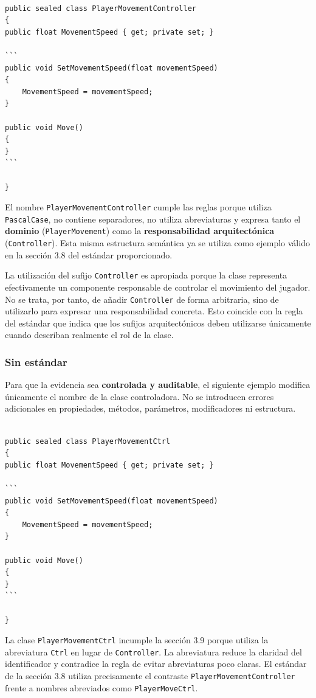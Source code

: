 \begin{lstlisting}[style=csharpstyle]

public sealed class PlayerMovementController
{
public float MovementSpeed { get; private set; }

```
public void SetMovementSpeed(float movementSpeed)
{
    MovementSpeed = movementSpeed;
}

public void Move()
{
}
```

}

\end{lstlisting}

El nombre \texttt{PlayerMovementController} cumple las reglas porque utiliza \texttt{PascalCase}, no contiene separadores, no utiliza abreviaturas y expresa tanto el \textbf{dominio} (\texttt{PlayerMovement}) como la \textbf{responsabilidad arquitectónica} (\texttt{Controller}). Esta misma estructura semántica ya se utiliza como ejemplo válido en la sección 3.8 del estándar proporcionado.

La utilización del sufijo \texttt{Controller} es apropiada porque la clase representa efectivamente un componente responsable de controlar el movimiento del jugador. No se trata, por tanto, de añadir \texttt{Controller} de forma arbitraria, sino de utilizarlo para expresar una responsabilidad concreta. Esto coincide con la regla del estándar que indica que los sufijos arquitectónicos deben utilizarse únicamente cuando describan realmente el rol de la clase.

\subsubsection{Sin estándar}

Para que la evidencia sea \textbf{controlada y auditable}, el siguiente ejemplo modifica únicamente el nombre de la clase controladora. No se introducen errores adicionales en propiedades, métodos, parámetros, modificadores ni estructura.

\begin{lstlisting}[style=csharpstyle]

public sealed class PlayerMovementCtrl
{
public float MovementSpeed { get; private set; }

```
public void SetMovementSpeed(float movementSpeed)
{
    MovementSpeed = movementSpeed;
}

public void Move()
{
}
```

}

\end{lstlisting}

La clase \texttt{PlayerMovementCtrl} incumple la sección 3.9 porque utiliza la abreviatura \texttt{Ctrl} en lugar de \texttt{Controller}. La abreviatura reduce la claridad del identificador y contradice la regla de evitar abreviaturas poco claras. El estándar de la sección 3.8 utiliza precisamente el contraste \texttt{PlayerMovementController} frente a nombres abreviados como \texttt{PlayerMoveCtrl}.

